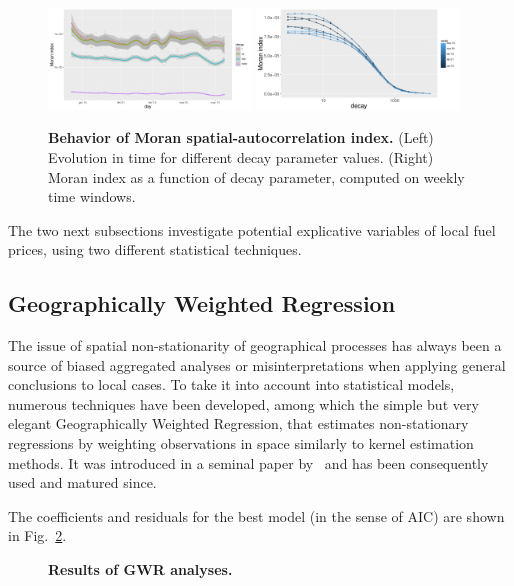 \documentclass[3p,times,procedia]{elsarticle}
\begin{document}
\begin{figure}
\centering
\includegraphics[width=0.48\textwidth]{figures/moran_days}
\includegraphics[width=0.48\textwidth]{figures/moran_decay_weeks}
\caption{\textbf{Behavior of Moran spatial-autocorrelation index.} (Left) Evolution in time for different decay parameter values. (Right) Moran index as a function of decay parameter, computed on weekly time windows.}
\label{fig:moran}
\end{figure}


The two next subsections investigate potential explicative variables of local fuel prices, using two different statistical techniques.

\subsection{Geographically Weighted Regression}

The issue of spatial non-stationarity of geographical processes has always been a source of biased aggregated analyses or misinterpretations when applying general conclusions to local cases. To take it into account into statistical models, numerous techniques have been developed, among which the simple but very elegant Geographically Weighted Regression, that estimates non-stationary regressions by weighting observations in space similarly to kernel estimation methods. It was introduced in a seminal paper by~\cite{brunsdon1996geographically} and has been consequently used and matured since.


The coefficients and residuals for the best model (in the sense of AIC) are shown in Fig.~\ref{fig:gwr}.


\begin{figure}
\centering
%
\caption{\textbf{Results of GWR analyses.}}
\label{fig:gwr}
\end{figure}
\end{document}
